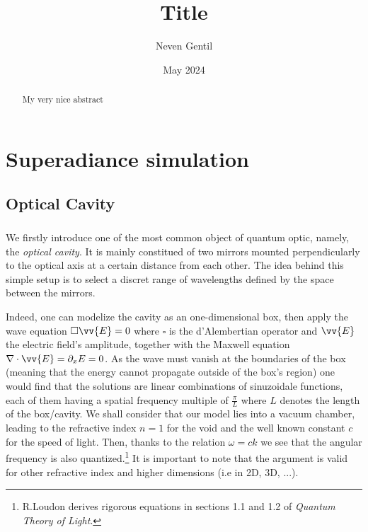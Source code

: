 \documentclass[12pt]{report}
\begin{document}
\title{Title}
\author{Neven Gentil}
\date{May 2024}
\maketitle

\begin{abstract}
My very nice abstract
\end{abstract}

\chapter{Superadiance simulation}
\section{Optical Cavity}
\paragraph{}
We firstly introduce one of the most common object of quantum optic, namely, the \textit{optical cavity}. It is mainly constitued of two mirrors mounted perpendicularly to the optical axis at a certain distance from each other. The idea behind this simple setup is to select a discret range of wavelengths defined by the space between the mirrors. 

Indeed, one can modelize the cavity as an one-dimensional box, then apply the wave equation $ \square \vv{E} = 0$ where $\square$ is the d'Alembertian operator and $\vv{E}$ the electric field's amplitude, together with the Maxwell equation $\nabla \cdot \vv{E} = \partial _x E = 0$. As the wave must vanish at the boundaries of the box (meaning that the energy cannot propagate outside of the box's region) one would find that the solutions are linear combinations of sinuzoidale functions, each of them having a spatial frequency multiple of $\frac{\pi}{L}$ where $L$ denotes the length of the box/cavity. We shall consider that our model lies into a vacuum chamber, leading to the refractive index $n=1$ for the void and the well known constant $ c$ for the speed of light. Then, thanks to the relation $\omega = ck$ we see that the angular frequency is also quantized.\footnote{R.Loudon derives rigorous equations in sections 1.1 and 1.2 of \textit{Quantum Theory of Light}.} It is important to note that the argument is valid for other refractive index and higher dimensions (i.e in 2D, 3D, ...).
\end{document}
